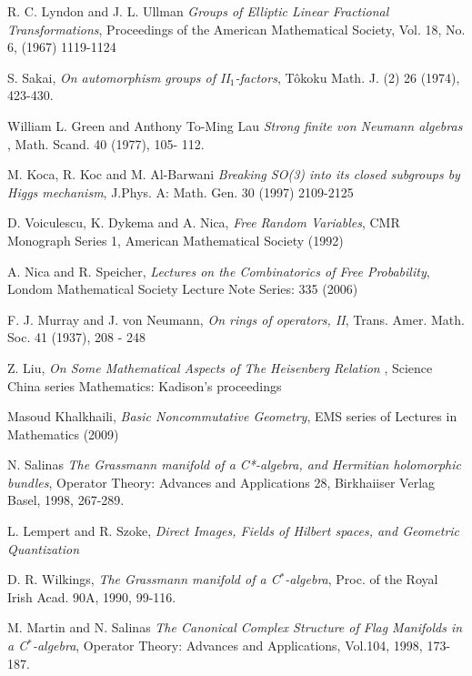 \documentclass[a4paper,10pt]{amsart}
\begin{document}
\begin{thebibliography}{9}
 R. C. Lyndon and J. L. Ullman {\em Groups of Elliptic Linear Fractional Transformations}, Proceedings of the American Mathematical Society,   Vol. 18, No. 6, (1967) 1119-1124

 S. Sakai, {\em On automorphism groups of II$_1$-factors}, T\^{o}koku Math. J. (2) 26 (1974), 423-430.

 William L. Green and Anthony To-Ming Lau {\em Strong finite von Neumann algebras }, Math. Scand. 40 (1977), 105- 112.

 M. Koca, R. Koc and M. Al-Barwani {\em Breaking SO(3) into its closed subgroups by Higgs mechanism}, J.Phys. A: Math. Gen. 30 (1997) 2109-2125

 D. Voiculescu, K. Dykema and A. Nica, {\em Free Random Variables}, CMR Monograph Series 1, American Mathematical Society (1992)

 A. Nica and R. Speicher, {\em Lectures on the Combinatorics of Free Probability}, Londom Mathematical Society Lecture Note Series: 335 (2006)

 F. J. Murray and J. von Neumann, {\em On rings of operators, II}, Trans. Amer. Math. Soc. 41 (1937), 208 - 248

 Z. Liu, {\em On Some Mathematical Aspects of The Heisenberg Relation }, Science China series Mathematics: Kadison's proceedings

 Masoud Khalkhaili, {\em Basic Noncommutative Geometry}, EMS series of Lectures in Mathematics (2009)

    N. Salinas
    {\em The Grassmann manifold of a C*-algebra, and Hermitian 
    holomorphic bundles}, 
    Operator Theory: Advances and Applications 28, 
    Birkhaiiser Verlag Basel, 1998, 267-289.

 L. Lempert and R. Szoke, {\em Direct Images, Fields of 
    Hilbert spaces, and Geometric Quantization}

 D. R. Wilkings, {\em The Grassmann manifold of a 
    C$^*$-algebra}, Proc. of the Royal Irish Acad. 90A, 1990, 99-116.

 M. Martin and N. Salinas {\em The Canonical Complex Structure
    of Flag Manifolds in a C$^{*}$-algebra},
    Operator Theory: Advances and Applications, Vol.104, 1998,
    173-187.
\end{thebibliography}
\end{document}
